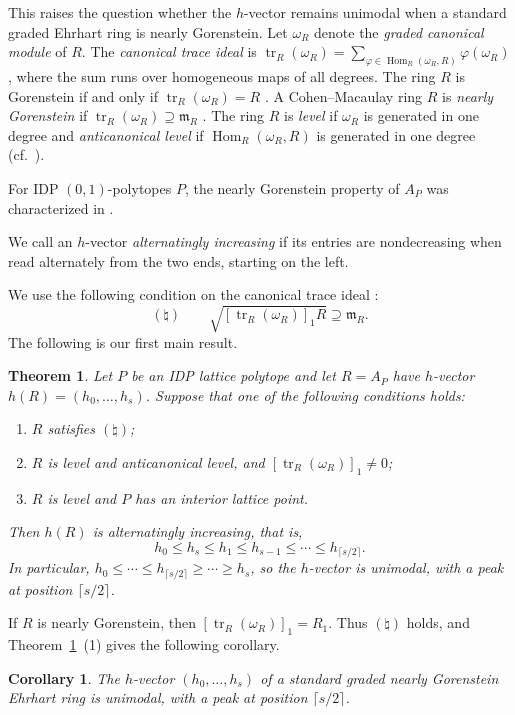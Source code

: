 \documentclass[a4paper,11pt]{amsart}
\DeclareMathOperator{\tr}{tr}
\DeclareMathOperator{\Hom}{Hom}
\newcommand{\m}{\mathfrak{m}}
\newcommand{\natur}{\natural}
\newtheorem{corollary}[theorem]{Corollary}
\newtheorem{maintheorem}{Theorem}
\theoremstyle{definition}
\begin{document}
This raises the question whether the $h$-vector remains unimodal when a standard graded Ehrhart ring is nearly Gorenstein. Let $\omega_R$ denote the \emph{graded canonical module} of $R$. The \emph{canonical trace ideal} is $\tr_R(\omega_R)=\sum_{\varphi\in\Hom_R(\omega_R,R)}\varphi(\omega_R)$, where the sum runs over homogeneous maps of all degrees. The ring $R$ is Gorenstein if and only if $\tr_R(\omega_R)=R$ \cite[Lemma~2.1]{HHS19}. A Cohen--Macaulay ring $R$ is \emph{nearly Gorenstein} if $\tr_R(\omega_R)\supseteq\m_R$ \cite{HHS19}. The ring $R$ is \emph{level} if $\omega_R$ is generated in one degree and \emph{anticanonical level} if $\Hom_R(\omega_R,R)$ is generated in one degree (cf.\ \cite[Definition~3.3]{Pa19}).

For IDP $(0,1)$-polytopes $P$, the nearly Gorenstein property of $A_P$ was characterized in \cite[Theorem~34]{HKMM23}.

We call an $h$-vector \emph{alternatingly increasing} if its entries are nondecreasing when read alternately from the two ends, starting on the left.

We use the following condition on the canonical trace ideal \cite[Definition~1.1]{M26}:
\[
(\natur)\qquad \sqrt{[\tr_R(\omega_R)]_1R}\supseteq\m_R.
\]
The following is our first main result.

\begin{maintheorem}\label{thm:A}
Let $P$ be an IDP lattice polytope and let $R=A_P$ have $h$-vector $h(R)=(h_0,\ldots,h_s)$. Suppose that one of the following conditions holds:
\begin{enumerate}
\item $R$ satisfies $(\natur)$;
\item $R$ is level and anticanonical level, and $[\tr_R(\omega_R)]_1\neq0$;
\item $R$ is level and $P$ has an interior lattice point.
\end{enumerate}
Then $h(R)$ is alternatingly increasing, that is,
\[
 h_0\leq h_s\leq h_1\leq h_{s-1}\leq\cdots\leq h_{\lceil s/2\rceil}.
\]
In particular, $h_0\leq\cdots\leq h_{\lceil s/2\rceil}\geq\cdots\geq h_s$, so the $h$-vector is unimodal, with a peak at position $\lceil s/2\rceil$.
\end{maintheorem}

If $R$ is nearly Gorenstein, then $[\tr_R(\omega_R)]_1=R_1$. Thus $(\natur)$ holds, and Theorem~\ref{thm:A}~\textup{(1)} gives the following corollary.

\begin{corollary}\label{cor:ng-ehrhart}
The $h$-vector $(h_0,\ldots,h_s)$ of a standard graded nearly Gorenstein Ehrhart ring is unimodal, with a peak at position $\lceil s/2\rceil$.
\end{corollary}
\end{document}
